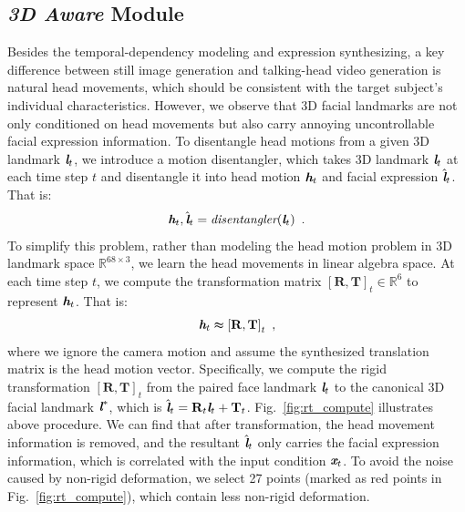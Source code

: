 \documentclass[runningheads]{llncs}
\def\mathbi#1{\textbf{\em #1}}
\providecommand{\ytian}[1]{\textcolor{green}{[{\bf #1}]}}
\begin{document}
\subsection{\textit{\textbf{3D Aware}} Module}
\label{subsec:3d_man}
 \indent Besides the temporal-dependency modeling and expression synthesizing, a key difference between still image generation and talking-head video generation is natural head movements, which should be consistent with the target subject's individual characteristics. However, we observe that 3D facial landmarks are not only conditioned on head movements but also carry annoying uncontrollable facial expression information. To disentangle head motions from a given 3D landmark $\mathbi{l}_t$, we introduce a motion disentangler, which takes 3D landmark $\mathbi{l}_t$ at each time step $t$ and disentangle it into head motion $\mathbi{h}_{t}$ and facial expression $\hat{\mathbi{l}}_{t}$. That is:
\begin{equation}
\begin{aligned}
{\mathbi{h}}_{t}, \hat{\mathbi{l}}_{t}  = \textit{disentangler} ( \mathbi{l}_{t} )  \enspace.
\end{aligned}
\label{eq:disentangle}    
\end{equation}
To simplify this problem, rather than modeling the head motion problem in 3D landmark space $\mathbb{R}^{68 \times 3}$, we learn the head movements in linear algebra space. At each time step $t$, we compute the transformation matrix $[\mathbf{R},\mathbf{T}]_t \in \mathbb{R}^{6}$  to represent $\mathbi{h}_{t}$. That is:
\begin{equation}
\begin{aligned}
{\mathbi{h}}_{t} \thickapprox [{\mathbf{R}},{\mathbf{T}]}_{t} \enspace,
\end{aligned}
\label{eq:headmovement2}    
\end{equation}
where we ignore the camera motion and assume the synthesized translation matrix is the head motion vector.
Specifically, we compute the rigid transformation $[\mathbf{R},\mathbf{T}]_t$ from the paired face landmark $\mathbi{l}_t$ to the canonical 3D facial landmark $\mathbi{l}^*$, which is $\hat{\mathbi{l}}_t = \mathbf{R}_t   \mathbi{l}_t + \mathbf{T}_t$. Fig.~\ref{fig:rt_compute} illustrates above procedure. We can find that after transformation, the head movement information is removed, and the resultant $\hat{\mathbi{l}}_t$ only carries the facial expression information, which is correlated with the input condition $\mathbi{x}_t$. To avoid the noise caused by non-rigid deformation, we select 27 points (marked as red points in Fig.~\ref{fig:rt_compute}), which contain less non-rigid deformation.
 
\end{document}

